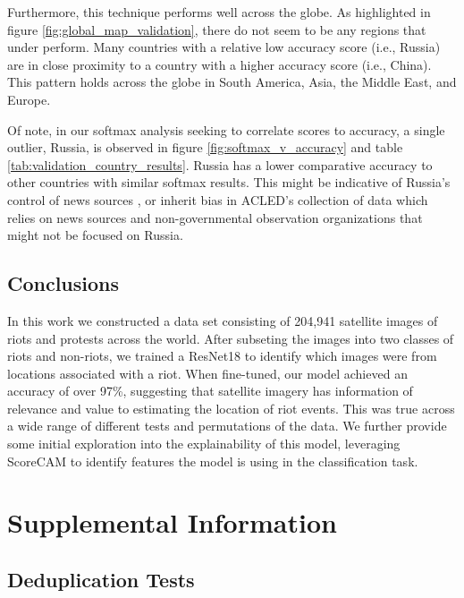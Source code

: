 Furthermore, this technique performs well across the globe.  As highlighted in figure \ref{fig:global_map_validation}, there do not seem to be any regions that under perform.  Many countries with a relative low accuracy score (i.e., Russia) are in close proximity to a country with a higher accuracy score (i.e., China).  This pattern holds across the globe in South America, Asia, the Middle East, and Europe. 

Of note, in our softmax analysis seeking to correlate scores to accuracy, a single outlier, Russia, is observed in figure \ref{fig:softmax_v_accuracy} and table \ref{tab:validation_country_results}.  Russia has a lower comparative accuracy to other countries with similar softmax results.  This might be indicative of Russia's control of news sources \citep{gehlbach2010reflections}, or inherit bias in ACLED's collection of data which relies on news sources and non-governmental observation organizations that might not be focused on Russia.





\subsection{Conclusions}
In this work we constructed a data set consisting of 204,941 satellite images of riots and protests across the world.  After subseting the images into two classes of riots and non-riots, we trained a ResNet18 to identify which images were from locations associated with a riot.  When fine-tuned, our model achieved an accuracy of over 97\%, suggesting that satellite imagery has information of relevance and value to estimating the location of riot events.  This was true across a wide range of different tests and permutations of the data. We further provide some initial exploration into the explainability of this model, leveraging ScoreCAM to identify features the model is using in the classification task.


\section{Supplemental Information}\label{sec:appendix}



\subsection{Deduplication Tests}\label{sec:limited_data_set}

